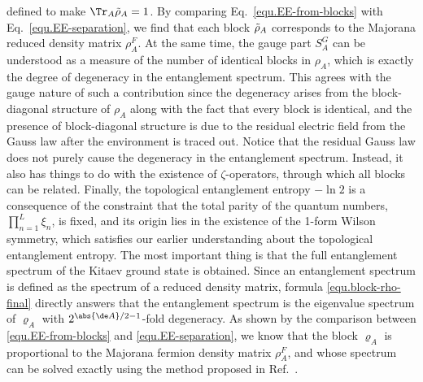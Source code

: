 defined to make $\Tr_A\Tilde{\rho}_A=1$. By comparing Eq.~\eqref{equ.EE-from-blocks} with Eq.~\eqref{equ.EE-separation}, we find that each block $\Tilde{\rho}_A$ corresponds to the Majorana reduced density matrix $\rho_A^F$. At the same time, the gauge part $S^G_A$ can be understood as a measure of the number of identical blocks in $\rho_A$, which is exactly the degree of degeneracy in the entanglement spectrum. This agrees with the gauge nature of such a contribution since the degeneracy arises from the block-diagonal structure of $\rho_A$ along with the fact that every block is identical, and the presence of block-diagonal structure is due to the residual electric field from the Gauss law after the environment is traced out. Notice that the residual Gauss law does not purely cause the degeneracy in the entanglement spectrum. Instead, it also has things to do with the existence of $\zeta$-operators, through which all blocks can be related. Finally, the topological entanglement entropy $-\ln 2$ is a consequence of the constraint that the total parity of the quantum numbers, $\prod_{n=1}^L\xi_n$, is fixed, and its origin lies in the existence of the 1-form Wilson symmetry, which satisfies our earlier understanding about the topological entanglement entropy. The most important thing is that the full entanglement spectrum of the Kitaev ground state is obtained. Since an entanglement spectrum is defined as the spectrum of a reduced density matrix, formula \eqref{equ.block-rho-final} directly answers that the entanglement spectrum is the eigenvalue spectrum of $\varrho_A$ with $2^{\abs{\de A}/2-1}$-fold degeneracy. As shown by the comparison between \eqref{equ.EE-from-blocks} and \eqref{equ.EE-separation}, we know that the block $\varrho_A$ is proportional to the Majorana fermion density matrix $\rho^F_A$, and whose spectrum can be solved exactly using the method proposed in Ref.~\cite{Jin-Korepin, Vidal-Latorre-Rico-Kitaev, Latorre-Rico-Vidal, Peschel_2003, Peschel_2009, Chung_2001, Cheong_2004}.

